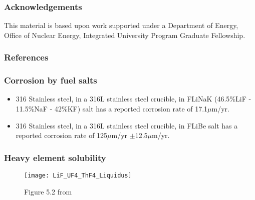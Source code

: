 \documentclass{beamer}
\begin{document}
\begin{frame}
\frametitle{Acknowledgements}

    This material is based upon work supported under a Department of Energy,
    Office of Nuclear Energy, Integrated University Program Graduate Fellowship.

\end{frame}

\begin{frame}[allowframebreaks]
\frametitle{References}

%

\end{frame}

\begin{frame}
\frametitle{Corrosion by fuel salts}

    \begin{itemize}
        \item 316 Stainless steel, in a 316L stainless steel crucible, in FLiNaK (46.5\%LiF - 11.5\%NaF - 42\%KF) salt has a reported corrosion rate of 17.1$\mu$m/yr. \cite{zheng_corrosion_2015}
        \item 316 Stainless steel, in a 316L stainless steel crucible, in FLiBe salt has a reported corrosion rate of 125$\mu$m/yr $\pm$12.5$\mu$m/yr.
    \end{itemize}

\end{frame}

\begin{frame}
\frametitle{Heavy element solubility}

    \begin{figure}
        \centering
        \texttt{[image: LiF\_UF4\_ThF4\_Liquidus]}
        \caption{Figure 5.2 from \cite{rosenthal_development_1972}}
        \label{fig:lifufthf_liquidus}
    \end{figure}

\end{frame}
\end{document}
